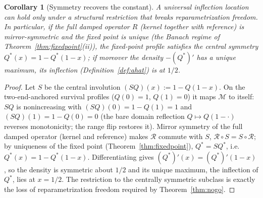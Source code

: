 \documentclass[11pt]{article}
\theoremstyle{plain}
\newtheorem{corollary}[theorem]{Corollary}
\theoremstyle{definition}
\theoremstyle{remark}
\newcommand{\Rc}{\mathcal R}
\begin{document}
\begin{corollary}[Symmetry recovers the constant]\label{cor:symmetry}
A universal inflection location can hold only under a structural restriction that breaks reparametrization freedom. In particular, if the full damped operator $R$ (kernel together with reference) is mirror-symmetric and the fixed point is unique (the Banach regime of Theorem~\ref{thm:fixedpoint}(ii)), the fixed-point profile satisfies the central symmetry $Q^*(x)=1-Q^*(1-x)$; if moreover the density $-(Q^*)'$ has a unique maximum, its inflection (Definition~\ref{def:ahat}) is at $1/2$.
\end{corollary}
\begin{proof}
Let $S$ be the central involution $(SQ)(x):=1-Q(1-x)$. On the two-end-anchored survival profiles ($Q(0)=1$, $Q(1)=0$) it maps $\mathcal M$ to itself: $SQ$ is nonincreasing with $(SQ)(0)=1-Q(1)=1$ and $(SQ)(1)=1-Q(0)=0$ (the bare domain reflection $Q\mapsto Q(1-\cdot)$ reverses monotonicity; the range flip restores it). Mirror symmetry of the full damped operator (kernel and reference) makes $\Rc$ commute with $S$, $\Rc\circ S=S\circ\Rc$; by uniqueness of the fixed point (Theorem~\ref{thm:fixedpoint}), $Q^*=SQ^*$, i.e.\ $Q^*(x)=1-Q^*(1-x)$. Differentiating gives $(Q^*)'(x)=(Q^*)'(1-x)$, so the density is symmetric about $1/2$ and its unique maximum, the inflection of $Q^*$, lies at $x=1/2$. The restriction to the centrally symmetric subclass is exactly the loss of reparametrization freedom required by Theorem~\ref{thm:nogo}.
\end{proof}
\end{document}

